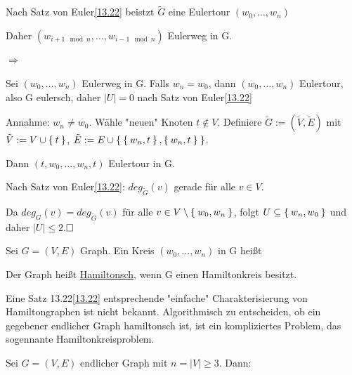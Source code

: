 \documentclass{../../meta/tudscript}
\begin{document}
    \setcounter{section}{13}
    \setcounter{subsection}{23}
   
    Nach Satz von Euler\ref{13.22} beistzt $\tilde{G}$ eine Eulertour $(w_0, \ldots, w_n)$
    
    Daher $(w_{i + 1 \mod n}, \ldots, w_{i - 1 \mod n})$ Eulerweg in G.

    \paragraph{$\Rightarrow$}
        Sei $(w_0, \ldots, w_n)$ Eulerweg in G. Falls $w_n = w_0$, dann $(w_0, \ldots, w_n)$
        Eulertour, also G eulersch, daher $|U| = 0$ nach Satz von Euler\ref{13.22}
        
        Annahme: $w_n \neq w_0$. Wähle "neuen" Knoten $t \notin V$. Definiere 
        $\tilde{G} := (\tilde{V}, \tilde{E})$ mit $\tilde{V} := V \cup \Set{t}$,
        $\tilde{E} := E \cup \Set{\Set{w_n, t}, \Set{w_n, t}}$.

        Dann $(t, w_0, \ldots, w_n, t)$ Eulertour in G.
        
        Nach Satz von Euler\ref{13.22}: $deg_{\tilde{G}} (v)$ gerade für alle $v \in V$.

        Da $deg_G (v) = deg_{\tilde{G}} (v)$ für alle $v \in V \setminus \Set{w_0, w_n}$,
        folgt $U \subseteq \Set{w_n, w_0}$ und daher $|U| \leq 2$.$\hfill\square$
      
        Sei $G = (V, E)$ Graph. Ein Kreis $(w_0, \ldots, w_n)$ in G heißt

        Der Graph heißt \underline{Hamiltonsch}, wenn G einen Hamiltonkreis besitzt.
        
        Eine Satz 13.22\ref{13.22} entsprechende "einfache" Charakterisierung von Hamiltongraphen ist nicht bekannt.
        Algorithmisch zu entscheiden, ob ein gegebener endlicher Graph hamiltonsch ist, ist ein kompliziertes
        Problem, das sogennante Hamiltonkreisproblem. 

        Sei $G = (V, E)$ endlicher Graph mit $n = |V| \geq 3$.
        Dann:
\end{document}

